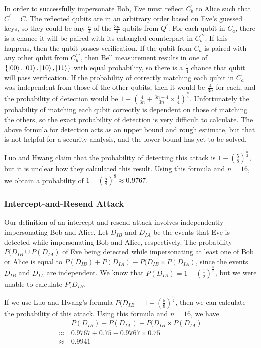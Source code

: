 \documentclass[conference,compsoc]{IEEEtran}
\begin{document}
In order to successfully impersonate Bob, Eve must reflect $C_{b}^{\prime}$
to Alice such that $C^{\prime}=C$. The reflected qubits are in an arbitrary order
based on Eve's guessed keys, so they could be any $\frac{n}{4}$ of the $\frac{3n}{4}$
qubits from $Q^{\prime}$.
For each qubit in $C_a$, there is a chance it will be paired with its
entangled counterpart in $C_b^{\prime\prime\prime}$. If this happens,
then the qubit passes verification. If the qubit from $C_a$ is paired
with any other qubit from $C_b^{\prime\prime\prime}$, then Bell measurement results in one of
$\left\{ \ket{00}, \ket{01}, \ket{10}, \ket{11} \right\}$ with equal probability, so there is
a $\frac{1}{4}$ chance that qubit will pass verification. If the probability of correctly matching
each qubit in $C_a$ was independent from those of the other qubits, then it would be $\frac{4}{3n}$ for each,
and the probability of detection would be $1 - \left( \frac{4}{3n} + \frac{3n - 4}{3n} \times \frac{1}{4} \right)^{\frac{n}{4}}$.
Unfortunately the probability of matching each qubit correctly is dependent on those of matching the others,
so the exact probability of detection is very difficult to calculate. The above formula for detection
acts as an upper bound and rough estimate, but that is not helpful for a security analysis, and the lower bound has yet to be solved.

Luo and Hwang claim that the probability of detecting this attack is $1 - \left( \frac{5}{8} \right)^{\frac{n}{2}}$,
but it is unclear how they calculated this result. Using this formula and $n=16$, we obtain a probability
of $1 - \left( \frac{5}{8} \right)^{8} \approx 0.9767$.

\subsubsection{Intercept-and-Resend Attack}

Our definition of an intercept-and-resend attack involves independently impersonating
Bob and Alice. Let $D_{IB}$ and $D_{IA}$ be the events that Eve is detected while impersonating
Bob and Alice, respectively. The probability $P(D_{IB} \cup P(D_{IA})$ of Eve
being detected while impersonating at least one of Bob or Alice is equal to
$P(D_{IB}) + P(D_{IA}) - P(D_{IB} \times P(D_{IA})$, since the events $D_{IB}$ and $D_{IA}$ are independent.
We know that $P(D_{IA}) = 1 - \left(\frac{1}{2}\right)^{\frac{n}{8}}$, but we were unable to calculate $P(D_{IB}$.

If we use Luo and Hwang's formula $P(D_{IB} = 1 - \left( \frac{5}{8} \right)^{\frac{n}{2}}$, then we can calculate the
probability of this attack. Using this formula and $n=16$, we have
\begin{align*}
        & P(D_{IB}) + P(D_{IA}) - P(D_{IB} \times P(D_{IA}) \\
    \approx\, & 0.9767 + 0.75 - 0.9767 \times 0.75 \\
    \approx\, & 0.9941 \\
\end{align*}
\end{document}
